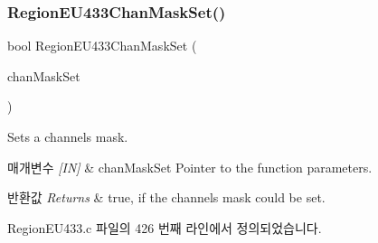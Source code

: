 \subsubsection{\texorpdfstring{Region\+E\+U433\+Chan\+Mask\+Set()}{RegionEU433ChanMaskSet()}}
{\footnotesize\ttfamily bool Region\+E\+U433\+Chan\+Mask\+Set (\begin{DoxyParamCaption}\item[{\mbox{\hyperlink{group___r_e_g_i_o_n_ga6d24f7da136006410827dfb29f6b9b9e}{Chan\+Mask\+Set\+Params\+\_\+t}} $\ast$}]{chan\+Mask\+Set }\end{DoxyParamCaption})}



Sets a channels mask. 


\begin{DoxyParams}{매개변수}
{\em \mbox{[}\+I\+N\mbox{]}} & chan\+Mask\+Set Pointer to the function parameters.\\
\hline
\end{DoxyParams}

\begin{DoxyRetVals}{반환값}
{\em Returns} & true, if the channels mask could be set. \\
\hline
\end{DoxyRetVals}


Region\+E\+U433.\+c 파일의 426 번째 라인에서 정의되었습니다.


